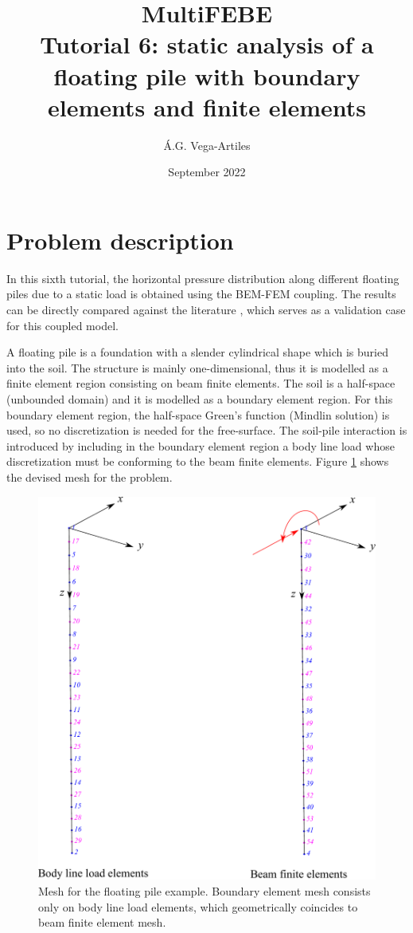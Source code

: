 \documentclass[a4]{article}
\title{MultiFEBE \\ Tutorial 6: static analysis of a floating pile with boundary elements and finite elements}
\author{\'A.G. Vega-Artiles}
\date{September 2022}
\begin{document}
\maketitle

\section{Problem description}

In this sixth tutorial, the horizontal pressure distribution along different floating piles due to a static load is obtained using the BEM-FEM coupling. The results can be directly compared against the literature \cite{poulos}, which serves as a validation case for this coupled model.

A floating pile is a foundation with a slender cylindrical shape which is buried into the soil. The structure is mainly one-dimensional, thus it is modelled as a finite element region consisting on beam finite elements. The soil is a half-space (unbounded domain) and it is modelled as a boundary element region. For this boundary element region, the half-space Green's function (Mindlin solution) is used, so no discretization is needed for the free-surface. The soil-pile interaction is introduced by including in the boundary element region a body line load whose discretization must be conforming to the beam finite elements. Figure \ref{fig:layout} shows the devised mesh for the problem.

\begin{figure}[tbh!]
	\centering
	\includegraphics[scale=0.4]{floating.pdf}
	\caption{Mesh for the floating pile example. Boundary element mesh consists only on body line load elements, which geometrically coincides to beam finite element mesh.}
	\label{fig:layout}
\end{figure}
\end{document}
